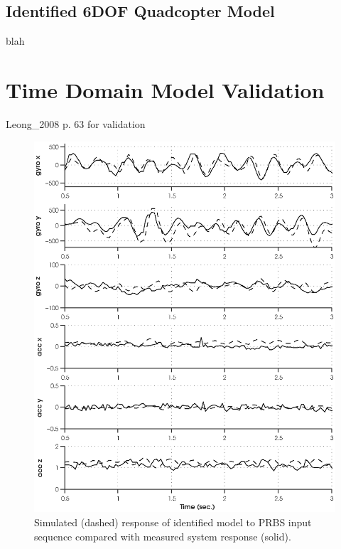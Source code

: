 \subsection{Identified 6DOF Quadcopter Model}
blah 








\section{Time Domain Model Validation}
Leong\_2008 p. 63 for validation


\newpage
\begin{figure}[htb!]
	\centering
	\includegraphics{../fig/sim_1760_20131017212626_31_38500.eps}
	\caption{Simulated (dashed) response of identified model to PRBS input sequence compared with measured system response (solid).}
\end{figure}\clearpage

